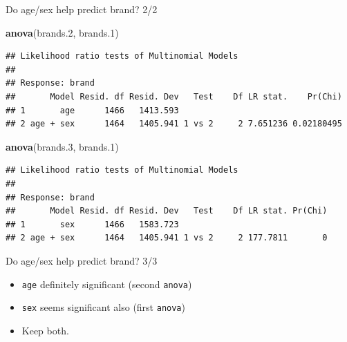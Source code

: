 \documentclass[ignorenonframetext,]{beamer}
\newenvironment{Shaded}{\begin{snugshade}}{\end{snugshade}}
\newcommand{\FloatTok}[1]{\textcolor[rgb]{0.00,0.00,0.81}{#1}}
\newcommand{\KeywordTok}[1]{\textcolor[rgb]{0.13,0.29,0.53}{\textbf{#1}}}
\newcommand{\NormalTok}[1]{#1}
\begin{document}
\begin{frame}[fragile]{Do age/sex help predict brand? 2/2}
\protect\hypertarget{do-agesex-help-predict-brand-22}{}

\scriptsize

\begin{Shaded}
\begin{Highlighting}[]
\KeywordTok{anova}\NormalTok{(brands}\FloatTok{.2}\NormalTok{, brands}\FloatTok{.1}\NormalTok{)}
\end{Highlighting}
\end{Shaded}

\begin{verbatim}
## Likelihood ratio tests of Multinomial Models
## 
## Response: brand
##       Model Resid. df Resid. Dev   Test    Df LR stat.    Pr(Chi)
## 1       age      1466   1413.593                                 
## 2 age + sex      1464   1405.941 1 vs 2     2 7.651236 0.02180495
\end{verbatim}

\begin{Shaded}
\begin{Highlighting}[]
\KeywordTok{anova}\NormalTok{(brands}\FloatTok{.3}\NormalTok{, brands}\FloatTok{.1}\NormalTok{)}
\end{Highlighting}
\end{Shaded}

\begin{verbatim}
## Likelihood ratio tests of Multinomial Models
## 
## Response: brand
##       Model Resid. df Resid. Dev   Test    Df LR stat. Pr(Chi)
## 1       sex      1466   1583.723                              
## 2 age + sex      1464   1405.941 1 vs 2     2 177.7811       0
\end{verbatim}

\normalsize

\end{frame}

\begin{frame}[fragile]{Do age/sex help predict brand? 3/3}
\protect\hypertarget{do-agesex-help-predict-brand-33}{}

\begin{itemize}
\item
  \texttt{age} definitely significant (second \texttt{anova})
\item
  \texttt{sex} seems significant also (first \texttt{anova})
\item
  Keep both.
\end{itemize}

\end{frame}
\end{document}
